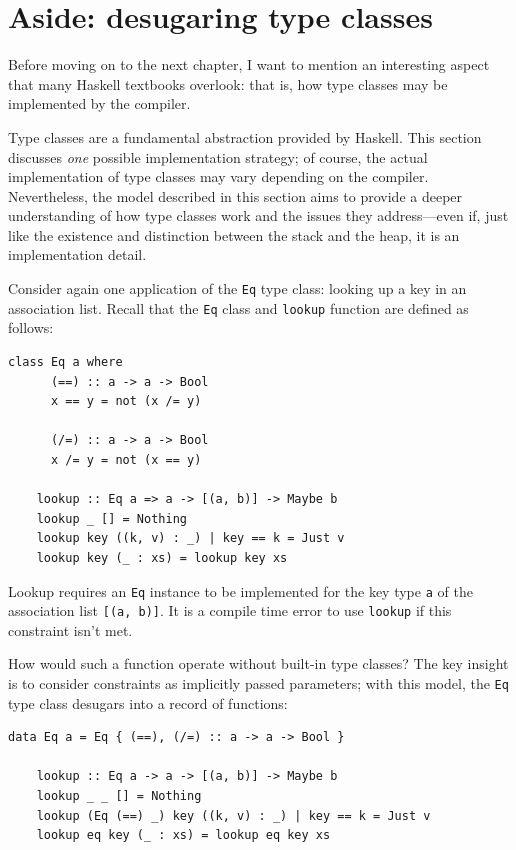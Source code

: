 \documentclass[UdineBachThesis,american,11pt]{PhdThesis}
\begin{document}
  \section{Aside: desugaring type classes}

  Before moving on to the next chapter, I want to mention an interesting aspect
  that many Haskell textbooks overlook: that is, how type classes may be
  implemented by the compiler.

  Type classes are a fundamental abstraction provided by Haskell. This section
  discusses \emph{one} possible implementation strategy; of course, the actual
  implementation of type classes may vary depending on the compiler.
  Nevertheless, the model described in this section aims to provide a deeper
  understanding of how type classes work and the issues they address---even if,
  just like the existence and distinction between the stack and the heap, it is
  an implementation detail.

  Consider again one application of the \mbox{\texttt{Eq}} type class: looking
  up a key in an association list. Recall that the \mbox{\texttt{Eq}} class and
  \mbox{\texttt{lookup}} function are defined as follows:

  \begin{Verbatim}[gobble=4,fontsize=\small]
    class Eq a where
      (==) :: a -> a -> Bool
      x == y = not (x /= y)

      (/=) :: a -> a -> Bool
      x /= y = not (x == y)

    lookup :: Eq a => a -> [(a, b)] -> Maybe b
    lookup _ [] = Nothing
    lookup key ((k, v) : _) | key == k = Just v
    lookup key (_ : xs) = lookup key xs
  \end{Verbatim}

  Lookup requires an \mbox{\texttt{Eq}} instance to be implemented for the key
  type \texttt{a} of the association list \mbox{\texttt{[(a, b)]}}. It is a
  compile time error to use \mbox{\texttt{lookup}} if this constraint isn't met.

  How would such a function operate without built-in type classes? The key
  insight is to consider constraints as implicitly passed parameters; with this
  model, the \mbox{\texttt{Eq}} type class desugars into a record of functions:

  \begin{Verbatim}[gobble=4,fontsize=\small]
    data Eq a = Eq { (==), (/=) :: a -> a -> Bool }

    lookup :: Eq a -> a -> [(a, b)] -> Maybe b
    lookup _ _ [] = Nothing
    lookup (Eq (==) _) key ((k, v) : _) | key == k = Just v
    lookup eq key (_ : xs) = lookup eq key xs
  \end{Verbatim}
\end{document}
